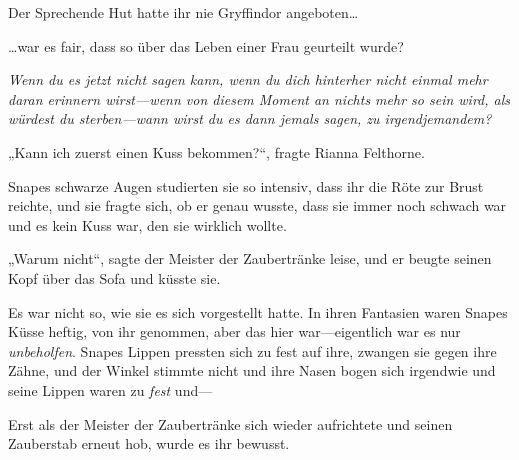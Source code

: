 Der Sprechende Hut hatte ihr nie Gryffindor angeboten…

…war es fair, dass so über das Leben einer Frau geurteilt wurde?

\emph{Wenn du es jetzt nicht sagen kann, wenn du dich hinterher nicht einmal mehr daran erinnern wirst—wenn von diesem Moment an nichts mehr so sein wird, als würdest du sterben—wann wirst du es dann jemals sagen, zu irgendjemandem?}

„Kann ich zuerst einen Kuss bekommen?“, fragte Rianna Felthorne.

Snapes schwarze Augen studierten sie so intensiv, dass ihr die Röte zur Brust reichte, und sie fragte sich, ob er genau wusste, dass sie immer noch schwach war und es kein Kuss war, den sie wirklich wollte.

„Warum nicht“, sagte der Meister der Zaubertränke leise, und er beugte seinen Kopf über das Sofa und küsste sie.

Es war nicht so, wie sie es sich vorgestellt hatte. In ihren Fantasien waren Snapes Küsse heftig, von ihr genommen, aber das hier war—eigentlich war es nur \emph{unbeholfen}. Snapes Lippen pressten sich zu fest auf ihre, zwangen sie gegen ihre Zähne, und der Winkel stimmte nicht und ihre Nasen bogen sich irgendwie und seine Lippen waren zu \emph{fest} und—

Erst als der Meister der Zaubertränke sich wieder aufrichtete und seinen Zauberstab erneut hob, wurde es ihr bewusst.

